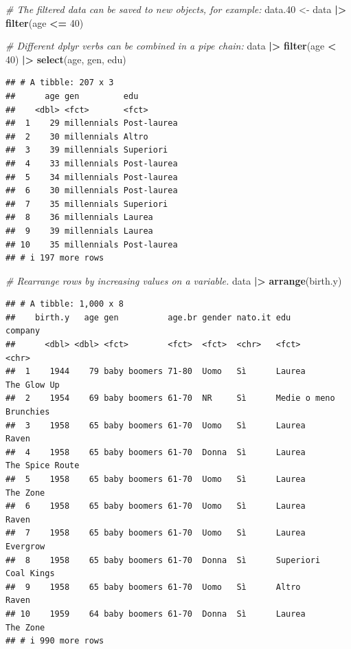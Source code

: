 \documentclass[
]{book}
\newenvironment{Shaded}{\begin{snugshade}}{\end{snugshade}}
\newcommand{\CommentTok}[1]{\textcolor[rgb]{0.56,0.35,0.01}{\textit{#1}}}
\newcommand{\DecValTok}[1]{\textcolor[rgb]{0.00,0.00,0.81}{#1}}
\newcommand{\FloatTok}[1]{\textcolor[rgb]{0.00,0.00,0.81}{#1}}
\newcommand{\FunctionTok}[1]{\textcolor[rgb]{0.13,0.29,0.53}{\textbf{#1}}}
\newcommand{\NormalTok}[1]{#1}
\newcommand{\OtherTok}[1]{\textcolor[rgb]{0.56,0.35,0.01}{#1}}
\newcommand{\SpecialCharTok}[1]{\textcolor[rgb]{0.81,0.36,0.00}{\textbf{#1}}}
\begin{document}
\begin{Shaded}
\begin{Highlighting}[]
\CommentTok{\# The filtered data can be saved to new objects, for example:}
\NormalTok{data}\FloatTok{.40} \OtherTok{\textless{}{-}}\NormalTok{ data }\SpecialCharTok{|\textgreater{}} 
  \FunctionTok{filter}\NormalTok{(age }\SpecialCharTok{\textless{}=} \DecValTok{40}\NormalTok{)}

\CommentTok{\# Different dplyr verbs can be combined in a pipe chain:}
\NormalTok{data }\SpecialCharTok{|\textgreater{}} 
  \FunctionTok{filter}\NormalTok{(age }\SpecialCharTok{\textless{}} \DecValTok{40}\NormalTok{) }\SpecialCharTok{|\textgreater{}} 
  \FunctionTok{select}\NormalTok{(age, gen, edu)}
\end{Highlighting}
\end{Shaded}

\begin{verbatim}
## # A tibble: 207 x 3
##      age gen         edu        
##    <dbl> <fct>       <fct>      
##  1    29 millennials Post-laurea
##  2    30 millennials Altro      
##  3    39 millennials Superiori  
##  4    33 millennials Post-laurea
##  5    34 millennials Post-laurea
##  6    30 millennials Post-laurea
##  7    35 millennials Superiori  
##  8    36 millennials Laurea     
##  9    39 millennials Laurea     
## 10    35 millennials Post-laurea
## # i 197 more rows
\end{verbatim}

\begin{Shaded}
\begin{Highlighting}[]
\CommentTok{\# Rearrange rows by increasing values on a variable.}
\NormalTok{data }\SpecialCharTok{|\textgreater{}} 
  \FunctionTok{arrange}\NormalTok{(birth.y)}
\end{Highlighting}
\end{Shaded}

\begin{verbatim}
## # A tibble: 1,000 x 8
##    birth.y   age gen          age.br gender nato.it edu          company        
##      <dbl> <dbl> <fct>        <fct>  <fct>  <chr>   <fct>        <chr>          
##  1    1944    79 baby boomers 71-80  Uomo   Sì      Laurea       The Glow Up    
##  2    1954    69 baby boomers 61-70  NR     Sì      Medie o meno Brunchies      
##  3    1958    65 baby boomers 61-70  Uomo   Sì      Laurea       Raven          
##  4    1958    65 baby boomers 61-70  Donna  Sì      Laurea       The Spice Route
##  5    1958    65 baby boomers 61-70  Uomo   Sì      Laurea       The Zone       
##  6    1958    65 baby boomers 61-70  Uomo   Sì      Laurea       Raven          
##  7    1958    65 baby boomers 61-70  Uomo   Sì      Laurea       Evergrow       
##  8    1958    65 baby boomers 61-70  Donna  Sì      Superiori    Coal Kings     
##  9    1958    65 baby boomers 61-70  Uomo   Sì      Altro        Raven          
## 10    1959    64 baby boomers 61-70  Donna  Sì      Laurea       The Zone       
## # i 990 more rows
\end{verbatim}
\end{document}
